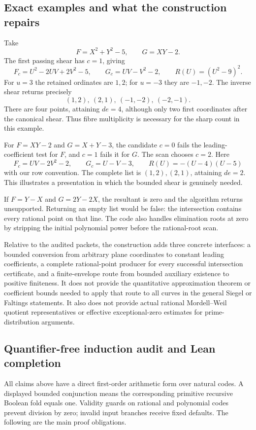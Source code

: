 \subsection{Exact examples and what the construction repairs}

Take
\[
 F=X^2+Y^2-5,\qquad G=XY-2.
\]
The first passing shear has \(c=1\), giving
\[
 F_c=U^2-2UV+2V^2-5,\qquad G_c=UV-V^2-2,
 \qquad R(U)=(U^2-9)^2.
\]
For \(u=3\) the retained ordinates are \(1,2\); for \(u=-3\) they
are \(-1,-2\).  The inverse shear returns precisely
\[
 (1,2),\ (2,1),\ (-1,-2),\ (-2,-1).
\]
There are four points, attaining \(de=4\), although only two first
coordinates after the canonical shear.  Thus fibre multiplicity is
necessary for the sharp count in this example.

For \(F=XY-2\) and \(G=X+Y-3\), the candidate \(c=0\) fails the
leading-coefficient test for \(F\), and \(c=1\) fails it for \(G\).
The scan chooses \(c=2\).  Here
\[
 F_c=UV-2V^2-2,\qquad G_c=U-V-3,
 \qquad R(U)=-(U-4)(U-5)
\]
with our row convention.  The complete list is \((1,2),(2,1)\),
attaining \(de=2\).  This illustrates a presentation in which the
bounded shear is genuinely needed.

If \(F=Y-X\) and \(G=2Y-2X\), the resultant is zero and the algorithm
returns unsupported.  Returning an empty list would be false: the
intersection contains every rational point on that line.  The code also
handles elimination roots at zero by stripping the initial polynomial
power before the rational-root scan.

Relative to the audited packets, the construction adds three concrete
interfaces: a bounded conversion from arbitrary plane coordinates to
constant leading coefficients, a complete rational-point producer for
every successful intersection certificate, and a finite-envelope route
from bounded auxiliary existence to positive finiteness.  It does not
provide the quantitative approximation theorem or coefficient bounds
needed to apply that route to all curves in the general Siegel or
Faltings statements.  It also does not provide actual rational
Mordell--Weil quotient representatives or effective exceptional-zero
estimates for prime-distribution arguments.

\subsection{Quantifier-free induction audit and Lean completion}

All claims above have a direct first-order arithmetic form over natural
codes.  A displayed bounded conjunction means the corresponding
primitive recursive Boolean fold equals one.  Validity guards on rational
and polynomial codes prevent division by zero; invalid input branches
receive fixed defaults.  The following are the main proof obligations.

